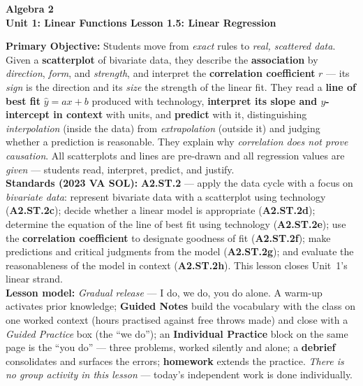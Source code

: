 \documentclass[10pt]{article}
\newcommand{\CourseName}{Algebra 2}
\newcommand{\UnitNumberName}{Unit 1: Linear Functions \quad}
\newcommand{\LessonNumberName}{Lesson 1.5: Linear Regression}
\begin{document}
\begin{center}
    {\Large\bfseries \CourseName \\
    {\small\bfseries \UnitNumberName \LessonNumberName}}
\end{center}

\begin{tcolorbox}[colback=forestbg, colframe=forest, boxrule=0.9pt, arc=2mm,
    left=2mm, right=2mm, top=1.5mm, bottom=1.5mm]
    \textbf{Primary Objective:} Students move from \emph{exact} rules to \emph{real, scattered
    data}. Given a \textbf{scatterplot} of bivariate data, they describe the \textbf{association}
    by \emph{direction}, \emph{form}, and \emph{strength}, and interpret the \textbf{correlation
    coefficient} $r$ --- its \emph{sign} is the direction and its \emph{size} the strength of the
    linear fit. They read a \textbf{line of best fit} $\hat y=ax+b$ produced with technology,
    \textbf{interpret its slope and $y$-intercept in context} with units, and \textbf{predict}
    with it, distinguishing \emph{interpolation} (inside the data) from \emph{extrapolation}
    (outside it) and judging whether a prediction is reasonable. They explain why
    \emph{correlation does not prove causation}. All scatterplots and lines are pre-drawn and all
    regression values are \emph{given} --- students read, interpret, predict, and justify.
    \\[2pt]
    \textbf{Standards (2023 VA SOL):} \textbf{A2.ST.2} --- apply the data cycle with a focus on
    \emph{bivariate data}: represent bivariate data with a scatterplot using technology
    (\textbf{A2.ST.2c}); decide whether a linear model is appropriate (\textbf{A2.ST.2d});
    determine the equation of the line of best fit using technology (\textbf{A2.ST.2e}); use the
    \textbf{correlation coefficient} to designate goodness of fit (\textbf{A2.ST.2f}); make
    predictions and critical judgments from the model (\textbf{A2.ST.2g}); and evaluate the
    reasonableness of the model in context (\textbf{A2.ST.2h}). This lesson closes Unit~1's
    linear strand.
    \\[2pt]
    \textbf{Lesson model:} \emph{Gradual release} --- I do, we do, you do alone. A warm-up
    activates prior knowledge; \textbf{Guided Notes} build the vocabulary with the class on one
    worked context (hours practised against free throws made) and close with a \emph{Guided
    Practice} box (the ``we do''); an \textbf{Individual Practice} block on the same page is the
    ``you do'' --- three problems, worked silently and alone; a \textbf{debrief} consolidates and
    surfaces the errors; \textbf{homework} extends the practice. \emph{There is no group activity
    in this lesson} --- today's independent work is done individually.
\end{tcolorbox}
\end{document}

